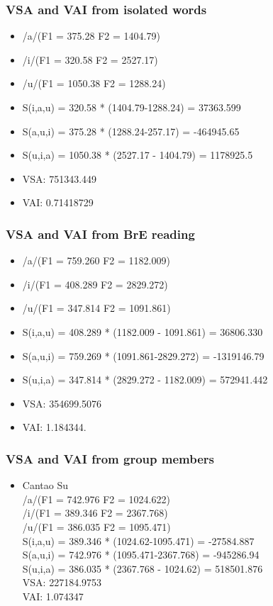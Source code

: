 \documentclass{../labbook}
\begin{document}
\begin{solution}

\subsubsection{VSA and VAI from isolated words}
 \begin{itemize}
 \item /a/(F1 =  375.28 F2 = 1404.79)
 \item /i/(F1 = 320.58 F2 = 2527.17)
 \item /u/(F1 = 1050.38 F2 = 1288.24)  
 \item S(i,a,u) = 320.58 * (1404.79-1288.24) = 37363.599
 \item S(a,u,i) = 375.28 * (1288.24-257.17) = -464945.65
 \item S(u,i,a) = 1050.38 * (2527.17 - 1404.79) = 1178925.5
 \item VSA: 751343.449 
 \item VAI: 0.71418729
 \end{itemize}

\subsubsection{VSA and VAI from BrE reading}
 \begin{itemize}
 \item /a/(F1 =  759.260 F2 = 1182.009)
 \item /i/(F1 = 408.289 F2 = 2829.272)
 \item /u/(F1 = 347.814 F2 = 1091.861)  
 \item S(i,a,u) = 408.289 * (1182.009 - 1091.861) = 36806.330
 \item S(a,u,i) = 759.269 * (1091.861-2829.272) = -1319146.79
 \item S(u,i,a) = 347.814 * (2829.272 - 1182.009) =  572941.442
 \item VSA: 354699.5076
 \item VAI: 1.184344.
 \end{itemize}


\subsubsection{VSA and VAI from group members}
\begin{itemize}
\item Cantao Su\\
/a/(F1 =  742.976 F2 = 1024.622)\\
/i/(F1 = 389.346 F2 = 2367.768)\\
/u/(F1 = 386.035 F2 = 1095.471)\\
S(i,a,u) = 389.346 * (1024.62-1095.471) = -27584.887\\
S(a,u,i) = 742.976 * (1095.471-2367.768) = -945286.94\\
S(u,i,a) = 386.035 * (2367.768 - 1024.62) = 518501.876\\
VSA: 227184.9753\\
VAI: 1.074347


\end{itemize}
\end{solution}
\end{document}
